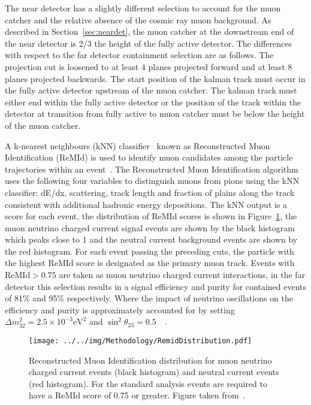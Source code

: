 The near detector has a slightly different selection to account for
the muon catcher and the relative absence of the cosmic ray muon
background. As described in Section~\ref{sec:neardet}, the
muon catcher at the downstream end of the near detector is 2/3 the
height of the fully active detector. 
The differences with respect to the far detector containment selection
are as follows. 
The projection cut is loosened to at least 4 planes projected forward
and at least 8 planes projected backwards. 
The start position of the
kalman track must occur in the fully active detector upstream of the
muon catcher. 
The kalman track must either end within the 
fully active detector or the position of the track within the detector
at transition from fully active to muon catcher must be below the
height of the muon catcher.~\cite{SASummary}

A k-nearest neighbours (kNN) classifier~\cite{altman1992introduction}
known as Reconstructed Muon Identification (ReMId)
is used to identify muon candidates among the particle
trajectories within an event~\cite{raddatzThesis}. 
The Reconstructed Muon Identification algorithm uses the following
four variables to distinguish muons from pions using the kNN
classifier:  
dE/dx, scattering, track length and fraction of plains along the track
consistent with additional hadronic energy
depositions. The kNN output is a score for each event, the
distribution of ReMId scores is shown in Figure~\ref{fig:remidDist},
the muon neutrino charged current signal events are shown by the black
histogram which peaks close to 1 and the neutral current background
events are shown by the red histogram. 
For each event passing the preceding cuts, the particle with the
highest ReMId score is designated as the primary muon track.
Events with $\text{ReMId} > 0.75$ are taken as muon neutrino
charged current interactions, in the far detector this selection
results in a signal efficiency and purity for contained events of 81\%
and 95\% respectively. 
Where the impact of neutrino oscillations on the efficiency
and purity is approximately accounted for by setting $\Delta m^2_{32}
= 2.5 \times 10^{-3} \text{eV}^2$ and $\sin^2\theta_{23} =
0.5$~\cite{raddatzThesis}~\cite{remidNote}.   

\begin{figure}[h]
  \centering
  \texttt{[image: ../../img/Methodology/RemidDistribution.pdf]}
  \caption{
    Reconstructed Muon Identification distribution for muon neutrino
    charged current events (black histogram) and neutral current
    events (red histogram). For the standard analysis events are
    required to have a ReMId score of 0.75 or greater. Figure taken
    from~\cite{remidNote}.  
  } 
  \label{fig:remidDist}
\end{figure}

